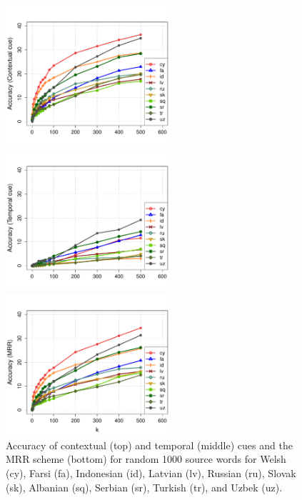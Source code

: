 \documentclass{article}
\begin{document}
\begin{figure}[h!]
\centerline{\mbox{\includegraphics[width=2.4in]{figures/exp3/rand/randcontext}}}
\centerline{\mbox{\includegraphics[width=2.4in]{figures/exp3/rand/randtime}}}
\centerline{\mbox{\includegraphics[width=2.4in]{figures/exp3/rand/randmrr}}}
\caption{Accuracy of contextual (top) and temporal (middle) cues and the MRR scheme (bottom) for random 1000 source words for Welsh (cy), Farsi (fa), Indonesian (id), Latvian (lv), Russian (ru), Slovak (sk), Albanian (sq), Serbian (sr), Turkish (tr), and Uzbek (uz).}
\label{fig:exp3}
\end{figure}

\end{document}
